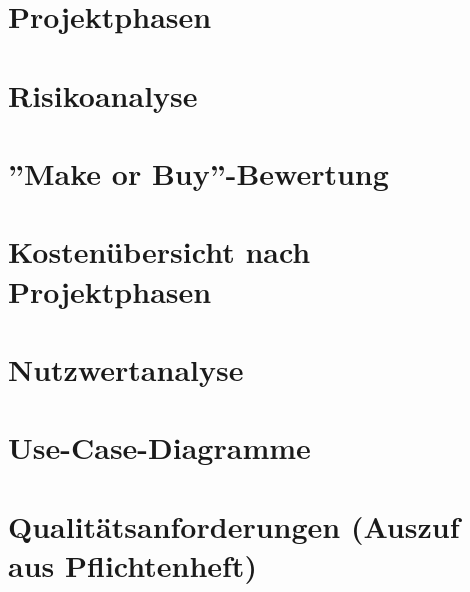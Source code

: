 \begin{appendices}

	
	\section{Projektphasen}		
		
		\newpage

	\section{Risikoanalyse}		
		
		\newpage		
		
	\section{''Make or Buy''-Bewertung}		
		
		\newpage
	
	\section{Kostenübersicht nach Projektphasen}		
		
		\newpage

	\section{Nutzwertanalyse}		
		
		\newpage
		
	\section{Use-Case-Diagramme}		
		
		\newpage		
		
	\section{Qualitätsanforderungen (Auszuf aus Pflichtenheft)}		
		
		\newpage
		
\end{appendices}